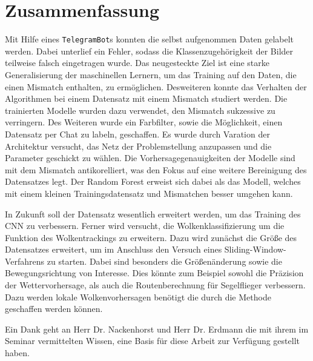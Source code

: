 \section{Zusammenfassung}
\label{sec:05_zusammenfassung}
Mit Hilfe eines \texttt{TelegramBot}s konnten die selbst aufgenommen
Daten gelabelt werden.
Dabei unterlief ein Fehler, sodass die Klassenzugehörigkeit der Bilder teilweise
falsch eingetragen wurde.
Das neugesteckte Ziel ist eine starke Generalisierung der maschinellen Lernern, 
um das Training auf den Daten, die einen Mismatch enthalten, zu ermöglichen.
Desweiteren konnte das Verhalten der Algorithmen bei einem Datensatz
mit einem Mismatch studiert werden.
Die trainierten Modelle wurden dazu verwendet, den Mismatch 
sukzessive zu verringern.
Des Weiteren wurde ein Farbfilter, sowie die Möglichkeit, einen 
Datensatz per Chat zu labeln, geschaffen.
Es wurde durch Varation der Architektur versucht, das Netz der Problemstellung
anzupassen und die Parameter geschickt zu wählen.
Die Vorhersagegenauigkeiten der Modelle sind mit dem Mismatch antikorelliert,
was den Fokus auf eine weitere Bereinigung des Datensatzes legt.
Der Random Forest erweist sich dabei als das Modell, welches mit 
einem kleinen Trainingsdatensatz und Mismatchen besser umgehen 
kann.

In Zukunft soll der Datensatz wesentlich erweitert werden, um das 
Training des CNN zu verbessern.
Ferner wird versucht, die Wolkenklassifizierung um die Funktion des
Wolkentrackings zu erweitern.
Dazu wird zunächst die Größe des Datensatzes erweitert, um im Anschluss den
Versuch eines Sliding-Window-Verfahrens zu starten.
Dabei sind besonders die Größenänderung sowie die Bewegungsrichtung von
Interesse.
Dies könnte zum Beispiel sowohl die Präzision der Wettervorhersage, als auch 
die Routenberechnung für Segelflieger verbessern. 
Dazu werden lokale Wolkenvorhersagen benötigt die durch die Methode
geschaffen werden können.

\vspace{3em}

Ein Dank geht an Herr Dr. Nackenhorst und Herr Dr. Erdmann die mit ihrem im
Seminar vermittelten Wissen, eine Basis für diese Arbeit zur Verfügung gestellt
haben.

